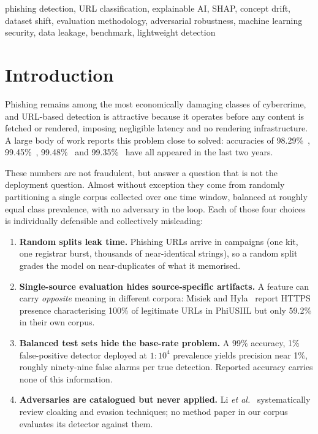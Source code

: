 \documentclass[conference]{IEEEtran}
\begin{document}
\begin{IEEEkeywords}
phishing detection, URL classification, explainable AI, SHAP, concept drift,
dataset shift, evaluation methodology, adversarial robustness, machine
learning security, data leakage, benchmark, lightweight detection
\end{IEEEkeywords}

\section{Introduction}

Phishing remains among the most economically damaging classes of
cybercrime, and URL-based detection is attractive because it operates
before any content is fetched or rendered, imposing negligible latency
and no rendering infrastructure. A large body of work reports this
problem close to solved: accuracies of 98.29\%~\cite{remya2024resmlp},
99.45\%~\cite{kustiawan2025feateng}, 99.48\%~\cite{kustiawan2025phishofe}
and 99.35\%~\cite{goenka2025layered} have all appeared in the last two
years.

These numbers are not fraudulent, but answer a question that is not the
deployment question. Almost without exception they come from randomly
partitioning a single corpus collected over one time window, balanced at
roughly equal class prevalence, with no adversary in the loop. Each of
those four choices is individually defensible and
collectively misleading:

\begin{enumerate}
\item \textbf{Random splits leak time.} Phishing URLs arrive in campaigns
      (one kit, one registrar burst, thousands of near-identical strings),
      so a random split grades the model on near-duplicates of what it
      memorised.
\item \textbf{Single-source evaluation hides source-specific artifacts.}
      A feature can carry \emph{opposite} meaning in different corpora:
      Misiek and Hyla~\cite{misiek2026xgboost} report HTTPS presence
      characterising 100\% of legitimate URLs in PhiUSIIL but only 59.2\%
      in their own corpus.
\item \textbf{Balanced test sets hide the base-rate problem.} A 99\%
      accuracy, 1\% false-positive detector deployed at $1{:}10^4$
      prevalence yields precision near 1\%, roughly ninety-nine false alarms per
      true detection. Reported accuracy carries none of this information.
\item \textbf{Adversaries are catalogued but never applied.} Li \emph{et
      al.}~\cite{li2023cloak} systematically review cloaking and evasion
      techniques; no method paper in our corpus evaluates its detector
      against them.
\end{enumerate}
\end{document}

